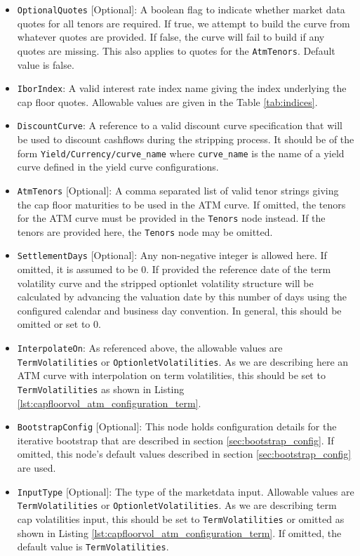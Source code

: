 \begin{itemize}
\item \lstinline!OptionalQuotes! [Optional]:
A boolean flag to indicate whether market data quotes for all tenors are required. If true, we attempt to build the curve from whatever quotes are provided. If false, the curve will fail to build if any quotes are missing. This also applies to quotes for the \lstinline!AtmTenors!. Default value is false.

\item \lstinline!IborIndex!:
A valid interest rate index name giving the index underlying the cap floor quotes. Allowable values are given in the Table \ref{tab:indices}.

\item \lstinline!DiscountCurve!:
A reference to a valid discount curve specification that will be used to discount cashflows during the stripping process. It should be of the form \lstinline!Yield/Currency/curve_name! where \lstinline!curve_name! is the name of a yield curve defined in the yield curve configurations.

\item \lstinline!AtmTenors! [Optional]:
A comma separated list of valid tenor strings giving the cap floor maturities to be used in the ATM curve. If omitted, the tenors for the ATM curve must be provided in the \lstinline!Tenors! node instead. If the tenors are provided here, the \lstinline!Tenors! node may be omitted.

\item \lstinline!SettlementDays! [Optional]:
Any non-negative integer is allowed here. If omitted, it is assumed to be 0. If provided the reference date of the term volatility curve and the stripped optionlet volatility structure will be calculated by advancing the valuation date by this number of days using the configured calendar and business day convention. In general, this should be omitted or set to 0.

\item \lstinline!InterpolateOn!:
As referenced above, the allowable values are \lstinline!TermVolatilities! or \lstinline!OptionletVolatilities!. As we are describing here an ATM curve with interpolation on term volatilities, this should be set to \lstinline!TermVolatilities! as shown in Listing \ref{lst:capfloorvol_atm_configuration_term}.

\item \lstinline!BootstrapConfig! [Optional]:
This node holds configuration details for the iterative bootstrap that are described in section \ref{sec:bootstrap_config}. If omitted, this node's default values described in section \ref{sec:bootstrap_config} are used.

\item \lstinline!InputType! [Optional]:
The type of the marketdata input. Allowable values are \lstinline!TermVolatilities! or \lstinline!OptionletVolatilities!. As we are describing term cap volatilities input, this should be set to \lstinline!TermVolatilities! or omitted as shown in Listing \ref{lst:capfloorvol_atm_configuration_term}. If omitted, the default value is \lstinline!TermVolatilities!.

\end{itemize}

